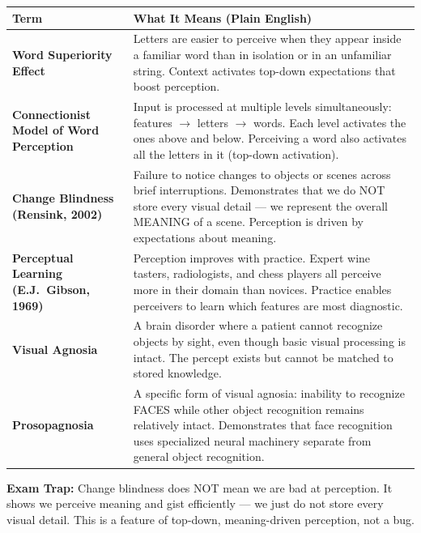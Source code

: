 \documentclass[11pt,a4paper]{article}
\newcommand{\bb}[1]{\textbf{#1}}
\begin{document}
\begin{center}
\renewcommand{\arraystretch}{1.4}
\begin{tabular}{|L{3.2cm}|L{12cm}|}
\hline
{}\color{white}\bb{Term} & \color{white}\bb{What It Means (Plain English)} \\
\hline
\bb{Word Superiority Effect} & Letters are easier to perceive when they appear inside a familiar word than in isolation or in an unfamiliar string. Context activates top-down expectations that boost perception. \\
\bb{Connectionist Model of Word Perception} & Input is processed at multiple levels simultaneously: features $\to$ letters $\to$ words. Each level activates the ones above and below. Perceiving a word also activates all the letters in it (top-down activation). \\
\bb{Change Blindness (Rensink, 2002)} & Failure to notice changes to objects or scenes across brief interruptions. Demonstrates that we do NOT store every visual detail --- we represent the overall MEANING of a scene. Perception is driven by expectations about meaning. \\
\bb{Perceptual Learning (E.J.\ Gibson, 1969)} & Perception improves with practice. Expert wine tasters, radiologists, and chess players all perceive more in their domain than novices. Practice enables perceivers to learn which features are most diagnostic. \\
\bb{Visual Agnosia} & A brain disorder where a patient cannot recognize objects by sight, even though basic visual processing is intact. The percept exists but cannot be matched to stored knowledge. \\
\bb{Prosopagnosia} & A specific form of visual agnosia: inability to recognize FACES while other object recognition remains relatively intact. Demonstrates that face recognition uses specialized neural machinery separate from general object recognition. \\
\hline
\end{tabular}
\end{center}

\begin{warnbox}
\bb{Exam Trap:} Change blindness does NOT mean we are bad at perception. It shows we perceive meaning and gist efficiently --- we just do not store every visual detail. This is a feature of top-down, meaning-driven perception, not a bug.
\end{warnbox}

\end{document}
